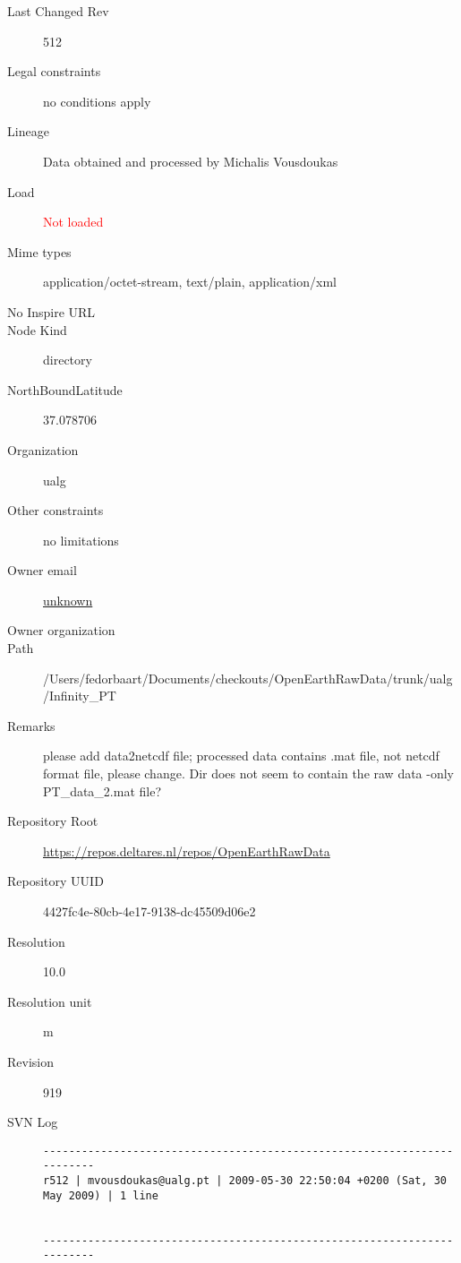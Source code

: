 \documentclass[9]{report}
\begin{document}
\begin{description}
  \item[Last Changed Rev] 512
  \item[Legal constraints] no conditions apply
  \item[Lineage] Data obtained and processed by Michalis Vousdoukas
  \item[Load] \textcolor{red}{Not loaded}
  \item[Mime types] application/octet-stream, text/plain, application/xml
  \item[No Inspire URL] 
  \item[Node Kind] directory
  \item[NorthBoundLatitude] 37.078706
  \item[Organization] ualg
  \item[Other constraints] no limitations
  \item[Owner email] \href{mailto:unknown}{unknown}
  \item[Owner organization] 
  \item[Path] /Users/fedorbaart/Documents/checkouts/OpenEarthRawData/trunk/ualg/Infinity\_PT
  \item[Remarks] please add data2netcdf file; processed data contains .mat file, not netcdf format file, please change. Dir does not seem to contain the raw data -only PT\_data\_2.mat file?
  \item[Repository Root] \href{https://repos.deltares.nl/repos/OpenEarthRawData}{https://repos.deltares.nl/repos/OpenEarthRawData}
  \item[Repository UUID] 4427fc4e-80cb-4e17-9138-dc45509d06e2
  \item[Resolution] 10.0
  \item[Resolution unit] m
  \item[Revision] 919
  \item[SVN Log] \begin{verbatim}
------------------------------------------------------------------------
r512 | mvousdoukas@ualg.pt | 2009-05-30 22:50:04 +0200 (Sat, 30 May 2009) | 1 line


------------------------------------------------------------------------


\end{verbatim}
\end{description}
\end{document}
